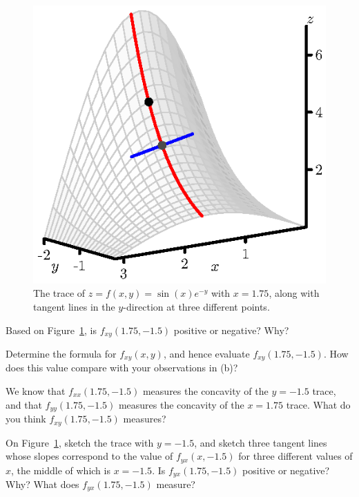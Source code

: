 \begin{activity}
\begin{figure}[ht]
\begin{center}
    \includegraphics[scale=0.8]{figures/fig_10_3_fxy_3.eps}
  \end{center}
  \caption{The trace of $z = f(x,y) = \sin(x)e^{-y}$ with $x = 1.75$, along with tangent lines in the $y$-direction at three different points.}
  \label{F:10.3.fxy}
\end{figure}	
Based on Figure~\ref{F:10.3.fxy}, is $f_{xy}(1.75, -1.5)$ positive or negative?  Why?

	\item Determine the formula for $f_{xy}(x,y)$, and hence evaluate $f_{xy}(1.75, -1.5)$.  How does this value compare with your observations in (b)?
	
	\item We know that $f_{xx}(1.75, -1.5)$ measures the concavity of the $y = -1.5$ trace, and that $f_{yy}(1.75, -1.5)$ measures the concavity of the $x = 1.75$ trace.  What do you think $f_{xy}(1.75, -1.5)$ measures?
	
	\item On Figure~\ref{F:10.3.fxy}, sketch the trace with $y = -1.5$, and sketch three tangent lines whose slopes correspond to the value of $f_{yx}(x,-1.5)$ for three different values of $x$, the middle of which is $x = -1.5$.  Is $f_{yx}(1.75, -1.5)$ positive or negative?  Why?  What does $f_{yx}(1.75, -1.5)$ measure?


  \ea

\end{activity}
